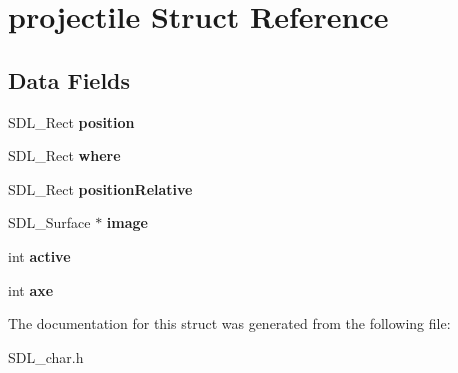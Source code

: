 \hypertarget{structprojectile}{}\section{projectile Struct Reference}
\label{structprojectile}
\subsection*{Data Fields}
\begin{DoxyCompactItemize}
\item 
\mbox{\label{structprojectile_a653b488cdc318abd4b0cbaf13469558b}} 
S\+D\+L\+\_\+\+Rect {\bfseries position}
\item 
\mbox{\label{structprojectile_a9577556e4bb2b7a479f0b8a9ffa03018}} 
S\+D\+L\+\_\+\+Rect {\bfseries where}
\item 
\mbox{\label{structprojectile_a0fe40930b1a904908401fbc94e49c962}} 
S\+D\+L\+\_\+\+Rect {\bfseries position\+Relative}
\item 
\mbox{\label{structprojectile_a17c742a3bac8e4a04c318f193bcaa423}} 
S\+D\+L\+\_\+\+Surface $\ast$ {\bfseries image}
\item 
\mbox{\label{structprojectile_aa84ac35cbc967bee2b13a4d31ff11360}} 
int {\bfseries active}
\item 
\mbox{\label{structprojectile_a427a45ba9ac140f6fde71d3afffe4233}} 
int {\bfseries axe}
\end{DoxyCompactItemize}


The documentation for this struct was generated from the following file\+:\begin{DoxyCompactItemize}
\item 
S\+D\+L\+\_\+char.\+h\end{DoxyCompactItemize}
